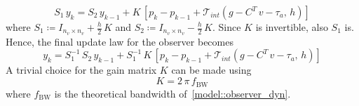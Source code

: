 \documentclass[letterpaper, 10 pt, conference]{ieeeconf}  %
\begin{document}
\begin{equation}\label{model::observer_law_final}
S_1\,y_k = S_{2}\,y_{k-1} + K\,\left[p_k-p_{k-1} + \mathcal{T}_{int}(g - C^T\,v - \tau_a,\,h)\right]
\end{equation}
where $S_1\coloneqq I_{n_v\times n_v} + \frac{h}{2}\,K$ and $S_2\coloneqq I_{n_v\times n_v} - \frac{h}{2}\,K$.
Since $K$ is invertible, also $S_1$ is. Hence, the final update law  for the observer becomes
\begin{dmath}
y_k = S_1^{-1}\,S_{2}\,y_{k-1} + S_1^{-1}\,K\,\left[p_k-p_{k-1} + \mathcal{T}_{int}(g - C^T\,v - \tau_a,\,h)\right]
\end{dmath} 
A trivial choice for the gain matrix $K$ can be made using 
\begin{equation}
K = 2\,\pi\,f_{\mathrm{BW}} 
\end{equation}
where $f_{\mathrm{BW}} $ is the theoretical bandwidth of~\eqref{model::observer_dyn}. 
\end{document}
